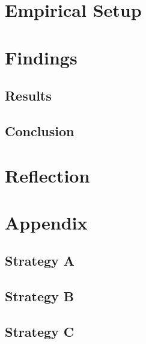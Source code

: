 \documentclass[12pt]{article}
\begin{document}
\section{Empirical Setup}

\section{Findings}

\subsection{Results}

\subsection{Conclusion}

\section{Reflection}

\section{Appendix}

\subsection{Strategy A}

\subsection{Strategy B}

\subsection{Strategy C}



\end{document}
